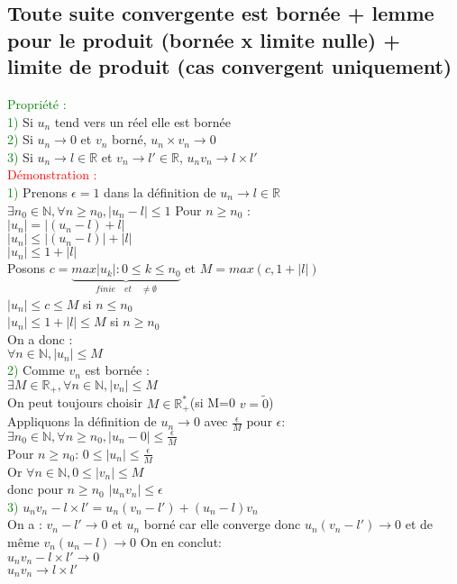 \documentclass{article}
\begin{document}
\subsection{Toute suite convergente est bornée + lemme pour le produit (bornée x limite nulle) + limite de produit (cas convergent uniquement)}
\textcolor{green}{Propriété :} \\ 
\textcolor{green}{1)} Si $u_n$ tend vers un réel elle est bornée \\ 
\textcolor{green}{2)} Si $u_n \rightarrow 0$ et $v_n$ borné, $u_n \times v_n\rightarrow 0$ \\ 
\textcolor{green}{3)} Si $u_n \rightarrow l \in \mathbb{R}$ et $v_n \rightarrow l' \in \mathbb{R}$, $u_nv_n \rightarrow l \times  l'$ \\ 
\textcolor{red}{Démonstration :} \\ 
\textcolor{green}{1)} Prenons $\epsilon=1$ dans la définition de $u_n \rightarrow l \in \mathbb{R}$ \\ 
$\exists n_0 \in \mathbb{N}, \forall n \geq n_0, |u_n-l| \leq 1$
Pour $n \geq n_0$ : \\ 
$|u_n|=|(u_n-l)+l|$ \\ 
$|u_n|\leq|(u_n-l)|+|l|$ \\ 
$|u_n|\leq 1+|l|$ \\ 
Posons $c= \underbrace{max{|u_k|:0\leq k \leq n_0}}_{finie \quad et \quad \neq \emptyset}$
et $M=max(c,1+|l|)$ \\  
$|u_n| \leq c \leq M$ si $n \leq n_0$ \\ 
$|u_n| \leq 1 + |l| \leq M$ si $n\geq n_0$ \\ 
On a donc : \\ 
$\forall n \in \mathbb{N}, |u_n| \leq M$ \\ 
\textcolor{green}{2)} Comme $v_n$ est bornée : \\ 
$\exists M \in \mathbb{R}_+, \forall n \in \mathbb{N}, |v_n| \leq M$ \\ 
On peut toujours choisir $M \in \mathbb{R}^*_+$(si M=0 $v=\tilde{0}$) \\ 
Appliquons la définition de $u_n \rightarrow 0$ avec $\frac{\epsilon}{M}$ pour $\epsilon$: \\ 
$\exists n_0 \in \mathbb{N}, \forall n \geq n_0, |u_n-0|\leq \frac{\epsilon}{M}$ \\ 
Pour $n \geq n_0$: $0 \leq |u_n| \leq \frac{\epsilon}{M}$ \\ 
Or $ \forall n \in \mathbb{N},0 \leq |v_n| \leq M$ \\ 
donc pour $n \geq n_0$ $|u_n v_n| \leq \epsilon$ \\ 
\textcolor{green}{3)} $u_nv_n-l\times l'=u_n(v_n-l')+(u_n-l)v_n$ \\ 
On a : $v_n-l' \rightarrow 0$ et $u_n$ borné car elle converge 
donc $u_n(v_n-l')\rightarrow 0$ et de même $v_n(u_n-l)\rightarrow 0$  On en conclut: \\ 
$u_nv_n-l\times l' \rightarrow 0$ \\
$u_nv_n\rightarrow l\times l' $
\end{document}
